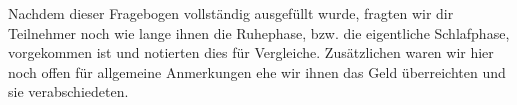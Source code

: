 Nachdem dieser Fragebogen vollständig ausgefüllt wurde, fragten wir dir Teilnehmer noch wie lange ihnen die Ruhephase, bzw. die eigentliche Schlafphase, vorgekommen ist und notierten dies für Vergleiche. Zusätzlichen waren wir hier noch offen für allgemeine Anmerkungen ehe wir ihnen das Geld überreichten und sie verabschiedeten.